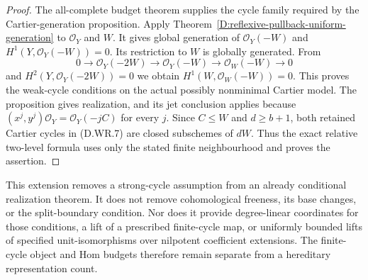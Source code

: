 \begin{proof}
The all-complete budget theorem supplies the cycle family
required by the Cartier-generation proposition. Apply
Theorem~\ref{D:reflexive-pullback-uniform-generation} to
$\mathcal O_Y$ and $W$. It gives global generation of
$\mathcal O_Y(-W)$ and $H^1(Y,\mathcal O_Y(-W))=0$.
Its restriction to $W$ is globally generated. From
\[
 0\longrightarrow\mathcal O_Y(-2W)
  \longrightarrow\mathcal O_Y(-W)
  \longrightarrow\mathcal O_W(-W)\longrightarrow0
\]
and $H^2(Y,\mathcal O_Y(-2W))=0$ we obtain
$H^1(W,\mathcal O_W(-W))=0$. This proves the weak-cycle
conditions on the actual possibly nonminimal Cartier model.
The proposition gives realization, and its jet conclusion
applies because $(x^j,y^j)\mathcal O_Y=\mathcal O_Y(-jC)$
for every $j$. Since $C\le W$ and $d\ge b+1$, both retained
Cartier cycles in (D.WR.7) are closed subschemes of $dW$.
Thus the exact relative two-level formula uses only the
stated finite neighbourhood and proves the assertion.
\end{proof}

\begin{remark}
This extension removes a strong-cycle assumption from an
already conditional realization theorem. It does not remove
cohomological freeness, its base changes, or the split-boundary
condition. Nor does it provide degree-linear coordinates for
those conditions, a lift of a prescribed finite-cycle map, or
uniformly bounded lifts of specified unit-isomorphisms over
nilpotent coefficient extensions. The finite-cycle object and
Hom budgets therefore remain separate from a hereditary
representation count.
\end{remark}
